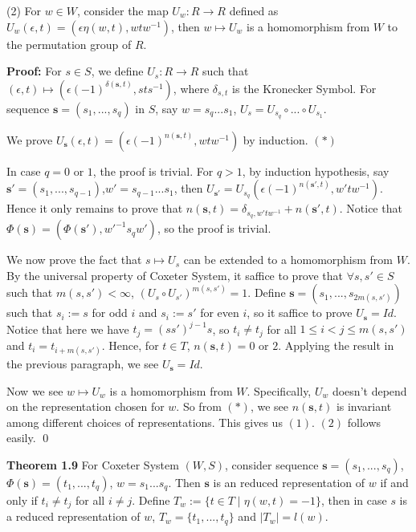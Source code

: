 \documentclass[../main.tex]{subfiles}
\begin{document}
\indent (2) For $w \in W$, consider the map $U_w:R \rightarrow R$ defined as $U_w(\epsilon,t)=(\epsilon \eta (w,t),wtw^{-1})$, then $w \mapsto U_w$ is a homomorphism from $W$ to the permutation group of $R$. 

\vspace{0.5\baselineskip}
\noindent \textbf{Proof:} For $s \in S$, we define $U_s:R \rightarrow R$ such that $(\epsilon,t) \mapsto (\epsilon(-1)^{\delta(\mathbf{s},t)},sts^{-1})$, where $\delta_{s,t}$ is the Kronecker Symbol. For sequence $\mathbf{s}=(s_1,...,s_q)$ in $S$, say $w=s_q...s_1$, $U_s=U_{s_q}\circ...\circ U_{s_1}$.

 We prove $U_{\mathbf{s}}(\epsilon,t)=(\epsilon(-1)^{n(\mathbf{s},t)},wtw^{-1})$ by induction. $(*)$

 In case $q=0$ or $1$, the proof is trivial. For $q >1$, by induction hypothesis, say $\mathbf{s'}=(s_1,...,s_{q-1})$,$w'=s_{q-1}...s_1$, then $U_{\mathbf{s'}}=U_{s_q}(\epsilon(-1)^{n(\mathbf{s'},t)},w'tw^{-1})$. Hence it only remains to prove that $n(\mathbf{s},t)=\delta_{s_q,w'tw^{-1}}+n(\mathbf{s'},t)$. Notice that $\Phi(\mathbf{s})=(\Phi(\mathbf{s'}),w'^{-1}s_qw')$, so the proof is trivial.

 We now prove the fact that $s\mapsto U_s$ can be extended to a homomorphism from $W$. By the universal property of Coxeter System, it saffice to prove that $\forall s,s' \in S$ such that $m(s,s') < \infty$, $(U_s \circ U_{s'})^{m(s,s')}=1$. Define $\mathbf{s}=(s_1,...,s_{2m(s,s')})$ such that $s_i:=s$ for odd $i$ and $s_i:=s'$ for even $i$, so it saffice to prove $U_{\mathbf{s}}=Id$. Notice that here we have $t_j=(ss')^{j-1}s$, so $t_i \ne t_j$ for all $1\le i<j \le m(s,s')$ and $t_i=t_{i+m(s,s')}$. Hence, for $t \in T$, $n(\mathbf{s},t)=0$ or $2$. Applying the result in the previous paragraph, we see $U_{\mathbf{s}}=Id$. 

 Now we see $w\mapsto U_w$ is a homomorphism from $W$. Specifically, $U_w$ doesn't depend on the representation chosen for $w$. So from $(*)$, we see $n(\mathbf{s},t)$ is invariant among different choices of representations. This gives us $(1)$. $(2)$ follows easily. \qed

\vspace{\baselineskip}
\noindent \textbf{Theorem 1.9} For Coxeter System $(W,S)$, consider sequence $\mathbf{s}=(s_1,...,s_q)$, $\Phi(\mathbf{s})=(t_1,...,t_q)$, $w=s_1...s_q$. Then $\mathbf{s}$ is an reduced representation of $w$ if and only if $t_i \ne t_j$ for all $i \ne j$. Define $T_w:=\{t \in T \mid \eta(w,t)=-1\}$, then in case $s$ is a reduced representation of $w$, $T_w=\{t_1,...,t_q\}$ and $|T_w|=l(w)$.
\end{document}
